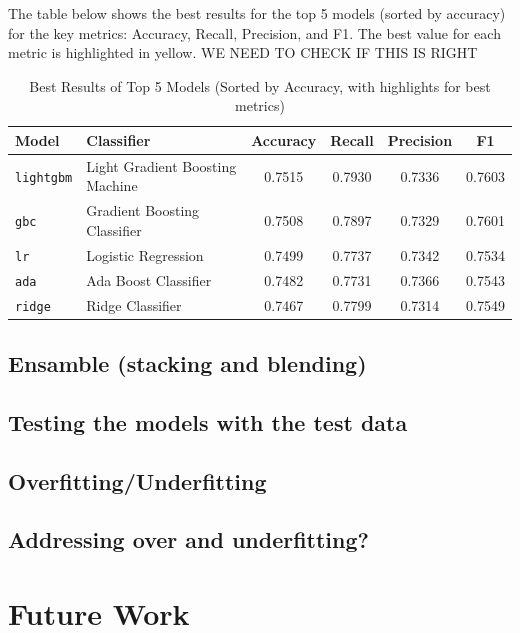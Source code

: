 \documentclass[a4paper,12pt]{article}
\begin{document}
The table below shows the best results for the top 5 models (sorted by accuracy) for the key metrics: Accuracy, Recall, Precision, and F1. The best value for each metric is highlighted in yellow.
WE NEED TO CHECK IF THIS IS RIGHT
\begin{table}[h!]
\centering
\begin{tabular}{l l c c c c}
\toprule
\textbf{Model} & \textbf{Classifier} & \textbf{Accuracy} & \textbf{Recall} & \textbf{Precision} & \textbf{F1} \\
\midrule
\texttt{lightgbm} & Light Gradient Boosting Machine & \cellcolor{yellow}0.7515 & \cellcolor{yellow}0.7930 & 0.7336 & \cellcolor{yellow}0.7603 \\  %
\texttt{gbc}    & Gradient Boosting Classifier & 0.7508 & 0.7897 & 0.7329 & 0.7601 \\  %
\texttt{lr}     & Logistic Regression & 0.7499 & 0.7737 & 0.7342 & 0.7534 \\  %
\texttt{ada}    & Ada Boost Classifier & 0.7482 & 0.7731 & \cellcolor{yellow}0.7366 & 0.7543 \\  %
\texttt{ridge}  & Ridge Classifier & 0.7467 & 0.7799 & 0.7314 & 0.7549 \\  %
\bottomrule
\end{tabular}
\caption{Best Results of Top 5 Models (Sorted by Accuracy, with highlights for best metrics)}
\label{tab:best_model_performance}
\end{table}
\subsection{Ensamble (stacking and blending)}
\subsection{Testing the models with the test data}
\subsection{Overfitting/Underfitting}
\subsection{Addressing over and underfitting?}

\section{Future Work}
\end{document}
